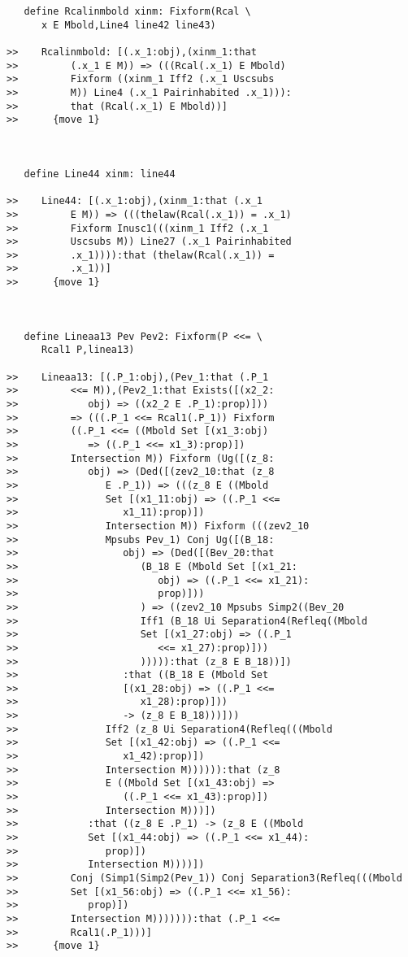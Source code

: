 \documentclass[12pt]{article}
\begin{document}
\begin{verbatim}
   define Rcalinmbold xinm: Fixform(Rcal \
      x E Mbold,Line4 line42 line43)

>>    Rcalinmbold: [(.x_1:obj),(xinm_1:that
>>         (.x_1 E M)) => (((Rcal(.x_1) E Mbold)
>>         Fixform ((xinm_1 Iff2 (.x_1 Uscsubs
>>         M)) Line4 (.x_1 Pairinhabited .x_1))):
>>         that (Rcal(.x_1) E Mbold))]
>>      {move 1}



   define Line44 xinm: line44

>>    Line44: [(.x_1:obj),(xinm_1:that (.x_1
>>         E M)) => (((thelaw(Rcal(.x_1)) = .x_1)
>>         Fixform Inusc1(((xinm_1 Iff2 (.x_1
>>         Uscsubs M)) Line27 (.x_1 Pairinhabited
>>         .x_1)))):that (thelaw(Rcal(.x_1)) =
>>         .x_1))]
>>      {move 1}



   define Lineaa13 Pev Pev2: Fixform(P <<= \
      Rcal1 P,linea13)

>>    Lineaa13: [(.P_1:obj),(Pev_1:that (.P_1
>>         <<= M)),(Pev2_1:that Exists([(x2_2:
>>            obj) => ((x2_2 E .P_1):prop)]))
>>         => (((.P_1 <<= Rcal1(.P_1)) Fixform
>>         ((.P_1 <<= ((Mbold Set [(x1_3:obj)
>>            => ((.P_1 <<= x1_3):prop)])
>>         Intersection M)) Fixform (Ug([(z_8:
>>            obj) => (Ded([(zev2_10:that (z_8
>>               E .P_1)) => (((z_8 E ((Mbold
>>               Set [(x1_11:obj) => ((.P_1 <<=
>>                  x1_11):prop)])
>>               Intersection M)) Fixform (((zev2_10
>>               Mpsubs Pev_1) Conj Ug([(B_18:
>>                  obj) => (Ded([(Bev_20:that
>>                     (B_18 E (Mbold Set [(x1_21:
>>                        obj) => ((.P_1 <<= x1_21):
>>                        prop)]))
>>                     ) => ((zev2_10 Mpsubs Simp2((Bev_20
>>                     Iff1 (B_18 Ui Separation4(Refleq((Mbold
>>                     Set [(x1_27:obj) => ((.P_1
>>                        <<= x1_27):prop)]))
>>                     ))))):that (z_8 E B_18))])
>>                  :that ((B_18 E (Mbold Set
>>                  [(x1_28:obj) => ((.P_1 <<=
>>                     x1_28):prop)]))
>>                  -> (z_8 E B_18)))]))
>>               Iff2 (z_8 Ui Separation4(Refleq(((Mbold
>>               Set [(x1_42:obj) => ((.P_1 <<=
>>                  x1_42):prop)])
>>               Intersection M)))))):that (z_8
>>               E ((Mbold Set [(x1_43:obj) =>
>>                  ((.P_1 <<= x1_43):prop)])
>>               Intersection M)))])
>>            :that ((z_8 E .P_1) -> (z_8 E ((Mbold
>>            Set [(x1_44:obj) => ((.P_1 <<= x1_44):
>>               prop)])
>>            Intersection M))))])
>>         Conj (Simp1(Simp2(Pev_1)) Conj Separation3(Refleq(((Mbold
>>         Set [(x1_56:obj) => ((.P_1 <<= x1_56):
>>            prop)])
>>         Intersection M))))))):that (.P_1 <<=
>>         Rcal1(.P_1)))]
>>      {move 1}




\end{verbatim}
\end{document}

